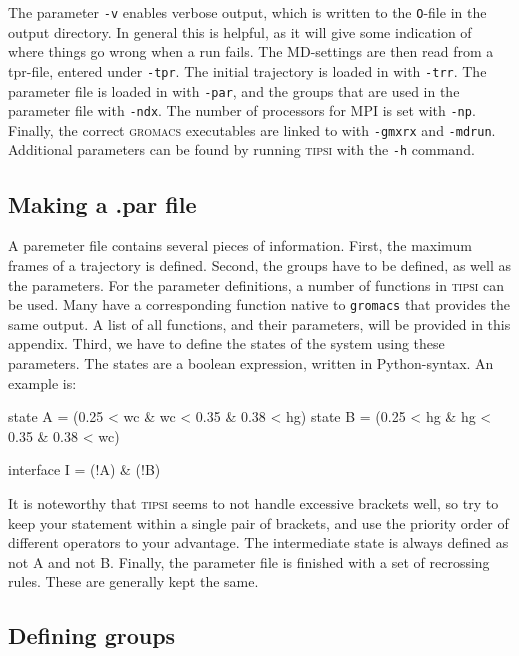 \documentclass[]{article}
\begin{document}
The parameter \texttt{-v} enables verbose output, which is written to the \texttt{O}-file in the output directory. 
In general this is helpful, as it will give some indication of where things go wrong when a run fails. 
The MD-settings are then read from a tpr-file, entered under \texttt{-tpr}. 
The initial trajectory is loaded in with \texttt{-trr}. 
The parameter file is loaded in with \texttt{-par}, and the groups that are used in the parameter file with \texttt{-ndx}. 
The number of processors for MPI is set with \texttt{-np}. 
Finally, the correct \textsc{gromacs} executables are linked to with \texttt{-gmxrx} and \texttt{-mdrun}.
Additional parameters can be found by running \textsc{tipsi} with the \texttt{-h} command.

\subsection*{Making a .par file}

A paremeter file contains several pieces of information. First, the maximum frames of a trajectory is defined. 
Second, the groups have to be defined, as well as the parameters. 
For the parameter definitions, a number of functions in \textsc{tipsi} can be used. 
Many have a corresponding function native to \texttt{gromacs} that provides the same output. 
A list of all functions, and their parameters, will be provided in this appendix. 
Third, we have to define the states of the system using these parameters.
The states are a boolean expression, written in Python-syntax. An example is:

\begin{lslisting}
state A = (0.25 < wc & wc < 0.35 & 0.38 < hg)
state B = (0.25 < hg & hg < 0.35 & 0.38 < wc)

interface I = (!A) & (!B)
\end{lslisting}

It is noteworthy that \textsc{tipsi} seems to not handle excessive brackets well, so try to keep your statement within a single pair of brackets, and use the priority order of different operators to your advantage.
The intermediate state is always defined as not A and not B.
Finally, the parameter file is finished with a set of recrossing rules. These are generally kept the same.

\subsection*{Defining groups}
\end{document}
